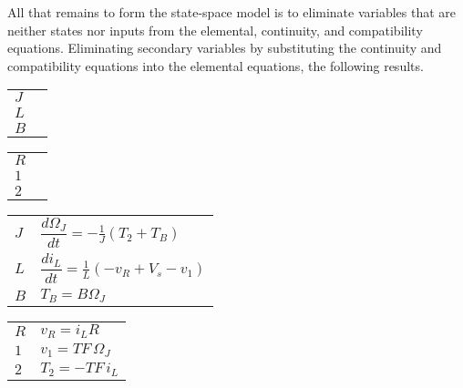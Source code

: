 \documentclass[dynamic_systems.tex]{subfiles}
\begin{document}
All that remains to form the state-space model is to eliminate variables that are neither states nor inputs from the elemental, continuity, and compatibility equations.
Eliminating secondary variables by substituting the continuity and compatibility equations into the elemental equations, the following results.
\tags{}
\begin{center}
\begingroup
\renewcommand{\arraystretch}{2}
\ifdefined\ispartial
\begin{tabular}{l|l}
	$J$ & \phantom{$\dfrac{d \Omega_J}{d t} = \frac{1}{J} T_J$}\\
	$L$ & \phantom{$\dfrac{d i_L}{d t} = \frac{1}{L} v_L$}\\
	$B$ & \phantom{$T_B = B \Omega_B$}
\end{tabular}
\qquad\qquad
\begin{tabular}{l|l}
	$R$ & \phantom{$v_R = i_R R$}\\
	$1$ & \phantom{$\Omega_2 = v_1/TF$}\\
	$2$ & \phantom{$T_2 = -TF\, i_1$}
\end{tabular}
\else
\begin{tabular}{l|l}
	$J$ & $\dfrac{d \Omega_J}{d t} = -\frac{1}{J} (T_2 + T_B) $\\
	$L$ & $\dfrac{d i_L}{d t} = \frac{1}{L} (-v_R + V_s - v_1)$\\
	$B$ & $T_B = B \Omega_J$
\end{tabular}
\qquad\qquad
\begin{tabular}{l|l}
	$R$ & $v_R = i_L R$\\
	$1$ & $v_1 = TF\, \Omega_J$\\
	$2$ & $T_2 = -TF\, i_L$
\end{tabular}
\fi
\endgroup
\end{center}
\end{document}
